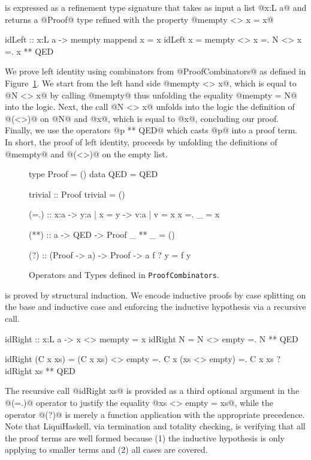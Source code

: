  is expressed
as a refinement type signature that takes as input
a list @x:L a@ and returns a @Proof@ type refined
with the property @mempty <> x = x@
\begin{code}
  idLeft :: x:L a -> {mempty mappend x = x}
  idLeft x 
    =  mempty <> x 
    =. N <> x 
    =. x 
    ** QED
\end{code}
%
We prove left identity using combinators from @ProofCombinators@ as
defined in Figure~\ref{figure:proofcombinators}.
%
We start from the left hand side @mempty <> x@,
which is equal to @N <> x@ by calling @mempty@ thus
unfolding the equality @mempty = N@ into the logic.
%
Next, the call @N <> x@ unfolds into the logic the definition of @(<>)@
on @N@ and @x@, which is equal to @x@, concluding our proof.
%
Finally, we use the operators @p ** QED@ which casts @p@ into a proof term.
%
In short, the proof of left identity, proceeds by unfolding the definitions of @mempty@
and @(<>)@ on the empty list.

\begin{figure}[t]
\centering
\captionsetup{justification=centering}
\begin{code}
  type Proof = ()
  data QED   = QED

  trivial :: Proof
  trivial = ()

  (=.) :: x:a -> y:{a | x = y} -> {v:a | v = x}
  x =. _ = x

  (**) :: a -> QED -> Proof
  _ ** _ = ()

  (?) :: (Proof -> a) -> Proof -> a
  f ? y = f y
\end{code}
\caption[Proof Operators and Types.]{Operators and Types defined in \texttt{ProofCombinators}.}
\label{figure:proofcombinators}
\end{figure}

 is proved by structural induction.
%
We encode inductive proofs by case splitting on the base and inductive case
and enforcing the inductive hypothesis via a recursive call.
\begin{code}
  idRight :: x:L a -> { x <> mempty = x }
  idRight N 
    =  N <> empty 
    =. N
    ** QED

  idRight (C x xs)
    =  (C x xs) <> empty
    =. C x (xs <> empty)
    =. C x xs ? idRight xs
    ** QED
\end{code}
The recursive call @idRight xs@ is provided
as a third optional argument in the @(=.)@
operator to justify the equality @xs <> empty = xs@,
while the operator @(?)@ is merely a function application
with the appropriate precedence.
%
Note that LiquiHaskell, via termination and totality checking,
is verifying that all the proof terms are well formed because
(1) the inductive hypothesis is only applying to smaller terms and
(2) all cases are covered.


